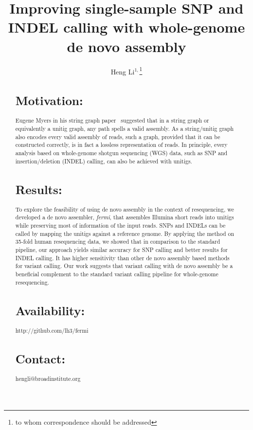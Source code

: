 \documentclass{bioinfo}
\begin{document}

\title[Variant calling with de novo assembly]{Improving single-sample SNP and INDEL calling with
whole-genome de novo assembly}

\author[Li]{Heng Li$^{1,}$\footnote{to whom correspondence should be addressed}}

\address{$^1$Broad Institute, 7 Cambridge Center, Cambridge, MA 02142, USA}

\maketitle

\begin{abstract}

\section{Motivation:}
Eugene Myers in his string graph paper~\citep{Myers:2005bh} suggested that in a
string graph or equivalently a unitig graph, any path spells a valid assembly.
As a string/unitig graph also encodes every valid assembly of reads, such a
graph, provided that it can be constructed correctly, is in fact a lossless
representation of reads. In principle, every analysis based on whole-genome
shotgun sequencing (WGS) data, such as SNP and insertion/deletion (INDEL)
calling, can also be achieved with unitigs.

\section{Results:}
To explore the feasibility of using de novo assembly in the context of
resequencing, we developed a de novo assembler, \emph{fermi}, that assembles
Illumina short reads into unitigs while preserving most of information of the
input reads. SNPs and INDELs can be called by mapping the unitigs against a
reference genome. By applying the method on 35-fold human resequencing data,
we showed that in comparison to the standard pipeline, our approach yields
similar accuracy for SNP calling and better results for INDEL calling. It has
higher sensitivity than other de novo assembly based methods for variant
calling. Our work suggests that variant calling with de novo assembly be a
beneficial complement to the standard variant calling pipeline for whole-genome
resequencing.

\section{Availability:} http://github.com/lh3/fermi
\section{Contact:} hengli@broadinstitute.org
\end{abstract}
\end{document}
